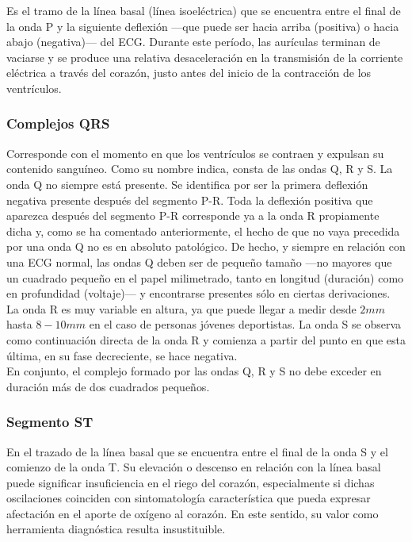 \documentclass[spanish,11pt,letterpaper,oneside]{memoir}
\begin{document}
Es el tramo de la línea basal (línea isoeléctrica) que se encuentra entre el final de la onda P y la siguiente deflexión ---que puede ser hacia arriba (positiva) o hacia abajo (negativa)--- del ECG. Durante este período, las aurículas terminan de vaciarse y se produce una relativa desaceleración en la transmisión de la corriente eléctrica a través del corazón, justo antes del inicio de la contracción de los ventrículos. 

\subsubsection{Complejos QRS}

Corresponde con el momento en que los ventrículos se contraen y expulsan su contenido sanguíneo. Como su nombre indica, consta de las ondas Q, R y S. La onda Q no siempre está presente. Se identifica por ser la primera deflexión negativa presente después del segmento P-R. Toda la deflexión positiva que aparezca después del segmento P-R corresponde ya a la onda R propiamente dicha y, como se ha comentado anteriormente, el hecho de que no vaya precedida por una onda Q no es en absoluto patológico. De hecho, y siempre en relación con una ECG normal, las ondas Q deben ser de pequeño tamaño ---no mayores que un cuadrado pequeño en el papel milimetrado, tanto en longitud (duración) como en profundidad (voltaje)--- y encontrarse presentes sólo en ciertas derivaciones. La onda R es muy variable en altura, ya que puede llegar a medir desde $2 mm$ hasta $8-10 mm$ en el caso de personas jóvenes deportistas. La onda S se observa como continuación directa de la onda R y comienza a partir del punto en que esta última, en su fase decreciente, se hace negativa.\\
En conjunto, el complejo formado por las ondas Q, R y S no debe exceder en duración más de dos cuadrados pequeños. 

\subsubsection{Segmento ST}

En el trazado de la línea basal que se encuentra entre el final de la onda S y el comienzo de la onda T. Su elevación o descenso en relación con la línea basal puede significar insuficiencia en el riego del corazón, especialmente si dichas oscilaciones coinciden con sintomatología característica que pueda expresar afectación en el aporte de oxígeno al corazón. En este sentido, su valor como herramienta diagnóstica resulta insustituible.
\end{document}
